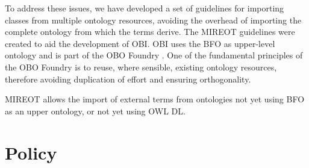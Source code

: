 \documentclass[a4paper,10pt,twocolumn]{article}
\begin{document}
To address these issues, we have developed a set of guidelines for importing classes from multiple ontology resources, avoiding the overhead of importing the complete ontology from which the terms derive. 
The \ac{MIREOT} guidelines were created to aid the development of \ac{OBI}\cite{RefWorks:1507}.
\ac{OBI} uses the \ac{BFO} \cite{RefWorks:1557} as upper-level ontology and is part of the \ac{OBO} Foundry \cite{RefWorks:1472}. 
One of the fundamental principles of the \ac{OBO} Foundry is to reuse, where sensible, existing ontology resources, therefore avoiding duplication of effort and ensuring orthogonality.


\ac{MIREOT} allows the import of external terms from ontologies not yet using BFO as an upper ontology, or not yet using OWL DL.


\section*{Policy}



\end{document}
